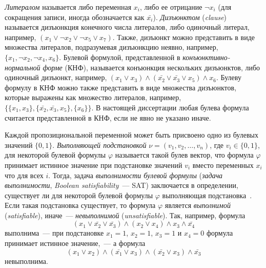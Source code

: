 \emph{Литералом} называется либо переменная $x_{i}$, либо ее отрицание $\neg x_{i}$ (для сокращения записи, иногда обозначается как $\bar{x_{i}}$).
\emph{Дизъюнктом} (\emph{clause}) называется дизъюнкция конечного числа литералов, либо одиночный литерал, например, $\left(x_{1} \vee \neg x_{2} \vee \neg x_{5} \vee x_{7}\right)$.
Также, дизъюнкт можно представить в виде множества литералов, подразумевая дизъюнкцию неявно, например, $\{x_{1}, \neg x_{2}, \neg x_{4}, x_{6}\}$.
Булевой формулой, представленной в \emph{конъюнктивно-нормальной форме} (КНФ), называется конъюнкция нескольких дизъюнктов, либо одиночный дизъюнкт, например, $\left(x_{1} \vee x_{3}\right) \wedge \left(\bar{x_{2}} \vee \bar{x_{3}} \vee x_{5}\right) \wedge x_{6}$.
Булеву формулу в КНФ можно также представить в виде множества дизъюнктов, которые выражены как множество литералов, например, $\{\{x_{1},x_{3}\}, \{\bar{x_{2}}, \bar{x_{3}}, x_{5}\}, \{x_{6}\}\}$.
В настоящей диссертации любая булева формула считается представленной в КНФ, если не явно не указано иначе.

Каждой пропозициональной переменной может быть присвоено одно из булевых значений $\{0, 1\}$.
\emph{Выполняющей подстановкой} $\nu = \left(v_{1},v_{2},\ldots,v_{n}\right)$, где $v_{i} \in \{0,1\}$, для некоторой булевой формулы $\varphi$ называется такой булев вектор, что формула $\varphi$ принимает истинное значение при подстановке значений $v_{i}$ вместо переменных $x_{i}$ что для всех $i$.
Тогда, задача \emph{выполнимости булевой формулы} (\emph{задача выполнимости}, \emph{Boolean satisfiability}~--- SAT) заключается в определении, существует ли для некоторой булевой формулы $\varphi$ выполняющая подстановка~\cite{SAThandbook-2009}.
Если такая подстановка существует, то формула $\varphi$ является \emph{выполнимой} (\emph{satisfiable}), иначе~--- \emph{невыполнимой} (\emph{unsatisfiable}). 
Так, например, формула
\begin{equation*}
\left(x_{1}\vee \bar{x_{2}} \vee \bar{x_{3}}\right) \wedge \left(x_{2} \vee x_{4}\right) \wedge x_{3} \wedge \bar{x_{4}}
\end{equation*}
выполнима~--- при подстановке $x_{1} = 1$, $x_{2} = 1$, $x_{3} = 1$ и $x_{4} = 0$ формула принимает истинное значение,~--- а формула
\begin{equation*}
\left(x_{1} \vee x_{2}\right) \wedge \left(\bar{x_{1}} \vee x_{3}\right) \wedge \left(\bar{x_{2}} \vee x_{3}\right) \wedge \bar{x_{3}}
\end{equation*}
невыполнима.


